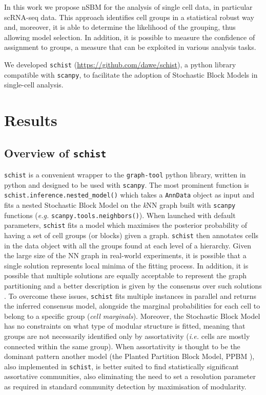 \documentclass[10pt]{article}
\begin{document}
In this work we propose nSBM for the analysis of single cell data, in particular scRNA-seq data. This approach identifies cell groups in a statistical robust way and, moreover, it is able to determine the likelihood of the grouping, thus allowing model selection. In addition, it is possible to measure the confidence of assignment to groups, a measure that can be exploited in various analysis tasks. 

We developed \texttt{schist} (\href{https://github.com/dawe/schist}{https:/\slash github.com\slash dawe\slash schist}), a python library compatible with \texttt{scanpy}, to facilitate the adoption of Stochastic Block Models in single-cell analysis.

\section*{Results}

\subsection*{Overview of \texttt{schist}}

\texttt{schist} is a convenient wrapper to the \texttt{graph-tool} python library, written in python and designed to be used with \texttt{scanpy}. The most prominent function is \texttt{schist.inference.nested\_model()} which takes a \texttt{AnnData} object as input and fits a nested Stochastic Block Model on the \emph{k}NN graph built with \texttt{scanpy} functions (\emph{e.g.} \texttt{scanpy.tools.neighbors()}). When launched with default parameters, \texttt{schist} fits a model which maximises the posterior probability of having a set of cell groups (or blocks) given a graph. \texttt{schist} then annotates cells in the data object with all the groups found at each level of a hierarchy. Given the large size of the NN graph in real-world experiments, it is possible that a single solution represents local minima of the fitting process. In addition, it is possible that multiple solutions are equally acceptable to represent the graph partitioning and a better description is given by the consensus over such solutions \cite{Peixoto_2021_consensus}. To overcome these issues, \texttt{schist} fits multiple instances in parallel and returns the inferred consensus model, alongside the marginal probabilities for each cell to belong to a specific group (\emph{cell marginals}). 
Moreover, the Stochastic Block Model has no constraints on what type of modular structure is fitted, meaning that groups are not necessarily identified only by assortativity (\emph{i.e.} cells are mostly connected within the same group). When assortativity is thought to be the dominant pattern another model (the Planted Partition Block Model, PPBM \cite{Zhang_Peixoto_2020}), also implemented in \texttt{schist}, is better suited to find statistically significant assortative communities, also eliminating the need to set a resolution parameter as required in standard community detection by maximisation of modularity.
\end{document}
